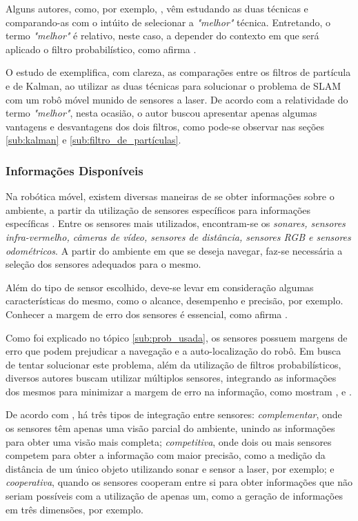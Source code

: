 			Alguns autores, como, por exemplo, \cite{comparacaoKalmanParticulas}, vêm estudando as duas técnicas e comparando-as com o intúito de selecionar a \textit{"melhor"} técnica. Entretando, o termo \textit{"melhor"} é relativo, neste caso, a depender do contexto em que será aplicado o filtro probabilístico, como afirma \cite{comparacaoKalmanParticulas}.

			O estudo de \cite{comparacaoKalmanParticulas} exemplifica, com clareza, as comparações entre os filtros de partícula e de Kalman, ao utilizar as duas técnicas para solucionar o problema de SLAM com um robô móvel munido de sensores a laser. De acordo com a relatividade do termo \textit{"melhor"}, nesta ocasião, o autor buscou apresentar apenas algumas vantagens e desvantagens dos dois filtros, como pode-se observar nas seções \ref{sub:kalman} e \ref{sub:filtro_de_partículas}.

		\subsubsection{Informações Disponíveis}
		\label{sub:infos_disponiveis}

			Na robótica móvel, existem diversas maneiras de se obter informações sobre o ambiente, a partir da utilização de sensores específicos para informações específicas \cite{interacaoRoboAmbiente}. Entre os sensores mais utilizados, encontram-se os \textit{sonares, sensores infra-vermelho, câmeras de vídeo, sensores de distância, sensores RGB e sensores odométricos}. A partir do ambiente em que se deseja navegar, faz-se necessária a seleção dos sensores adequados para o mesmo.

			Além do tipo de sensor escolhido, deve-se levar em consideração algumas características do mesmo, como o alcance, desempenho e precisão, por exemplo. Conhecer a margem de erro dos sensores é essencial, como afirma \cite{wall_following}.

			Como foi explicado no tópico \ref{sub:prob_usada}, os sensores possuem margens de erro que podem prejudicar a navegação e a auto-localização do robô. Em busca de tentar solucionar este problema, além da utilização de filtros probabilísticos, diversos autores buscam utilizar múltiplos sensores, integrando as informações dos mesmos para minimizar a margem de erro na informação, como mostram \cite{fusingSensorsParallel}, \cite{neuralNetwork} e \cite{slamProblem}.

			De acordo com \cite{agenteExploratorioKalman}, há três tipos de integração entre sensores: \textit{complementar}, onde os sensores têm apenas uma visão parcial do ambiente, unindo as informações para obter uma visão mais completa; \textit{competitiva}, onde dois ou mais sensores competem para obter a informação com maior precisão, como a medição da distância de um único objeto utilizando sonar e sensor a laser, por exemplo; e \textit{cooperativa}, quando os sensores cooperam entre si para obter informações que não seriam possíveis com a utilização de apenas um, como a geração de informações em três dimensões, por exemplo.

